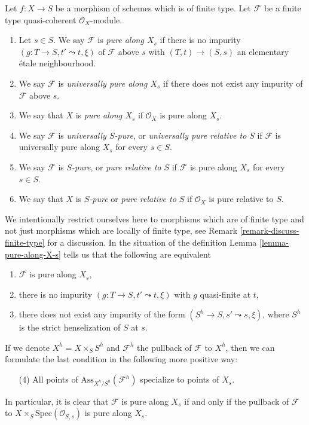 \begin{definition}
\label{definition-pure}
Let $f : X \to S$ be a morphism of schemes which is of finite type.
Let $\mathcal{F}$ be a finite type quasi-coherent $\mathcal{O}_X$-module.
\begin{enumerate}
\item Let $s \in S$. We say $\mathcal{F}$ is {\it pure along $X_s$}
if there is no impurity $(g : T \to S, t' \leadsto t, \xi)$
of $\mathcal{F}$ above $s$ with $(T, t) \to (S, s)$ an
elementary \'etale neighbourhood.
\item We say $\mathcal{F}$ is {\it universally pure along $X_s$}
if there does not exist any impurity of $\mathcal{F}$ above $s$.
\item We say that $X$ is {\it pure along $X_s$} if $\mathcal{O}_X$
is pure along $X_s$.
\item We say $\mathcal{F}$ is {\it universally $S$-pure}, or
{\it universally pure relative to $S$} if $\mathcal{F}$ is universally
pure along $X_s$ for every $s \in S$.
\item We say $\mathcal{F}$ is {\it $S$-pure}, or
{\it pure relative to $S$} if $\mathcal{F}$ is pure along $X_s$
for every $s \in S$.
\item We say that $X$ is {\it $S$-pure} or {\it pure relative to $S$}
if $\mathcal{O}_X$ is pure relative to $S$.
\end{enumerate}
\end{definition}

\noindent
We intentionally restrict ourselves here to morphisms which are
of finite type and not just morphisms which are locally of
finite type, see
Remark \ref{remark-discuss-finite-type}
for a discussion. In the situation of the definition
Lemma \ref{lemma-pure-along-X-s}
tells us that the following are equivalent
\begin{enumerate}
\item $\mathcal{F}$ is pure along $X_s$,
\item there is no impurity $(g : T \to S, t' \leadsto t, \xi)$ with $g$
quasi-finite at $t$,
\item there does not exist any impurity of the form
$(S^h \to S, s' \leadsto s, \xi)$, where $S^h$ is the strict henselization
of $S$ at $s$.
\end{enumerate}
If we denote $X^h = X \times_S S^h$ and $\mathcal{F}^h$ the pullback
of $\mathcal{F}$ to $X^h$, then we can formulate the last condition
in the following more positive way:
\begin{enumerate}
\item[(4)] All points of $\text{Ass}_{X^h/S^h}(\mathcal{F}^h)$ specialize
to points of $X_s$.
\end{enumerate}
In particular, it is clear that $\mathcal{F}$ is pure along $X_s$
if and only if the pullback of $\mathcal{F}$ to
$X \times_S \text{Spec}(\mathcal{O}_{S, s})$ is pure along $X_s$.

